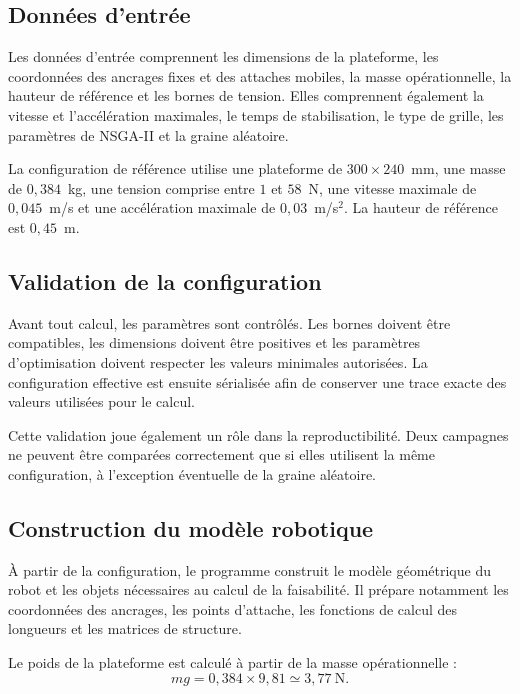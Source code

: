 \subsection{Données d'entrée}

Les données d'entrée comprennent les dimensions de la plateforme, les coordonnées des ancrages fixes et des attaches mobiles, la masse opérationnelle, la hauteur de référence et les bornes de tension. Elles comprennent également la vitesse et l'accélération maximales, le temps de stabilisation, le type de grille, les paramètres de NSGA-II et la graine aléatoire.

La configuration de référence utilise une plateforme de $300\times240$~mm, une masse de $0{,}384$~kg, une tension comprise entre $1$ et $58$~N, une vitesse maximale de $0{,}045$~m/s et une accélération maximale de $0{,}03$~m/s$^2$. La hauteur de référence est $0{,}45$~m.

\subsection{Validation de la configuration}

Avant tout calcul, les paramètres sont contrôlés. Les bornes doivent être compatibles, les dimensions doivent être positives et les paramètres d'optimisation doivent respecter les valeurs minimales autorisées. La configuration effective est ensuite sérialisée afin de conserver une trace exacte des valeurs utilisées pour le calcul.

Cette validation joue également un rôle dans la reproductibilité. Deux campagnes ne peuvent être comparées correctement que si elles utilisent la même configuration, à l'exception éventuelle de la graine aléatoire.

\subsection{Construction du modèle robotique}

À partir de la configuration, le programme construit le modèle géométrique du robot et les objets nécessaires au calcul de la faisabilité. Il prépare notamment les coordonnées des ancrages, les points d'attache, les fonctions de calcul des longueurs et les matrices de structure.

Le poids de la plateforme est calculé à partir de la masse opérationnelle :
\begin{equation}
mg = 0{,}384\times9{,}81 \simeq 3{,}77~\text{N}.
\label{eq:poids_tandem}
\end{equation}

